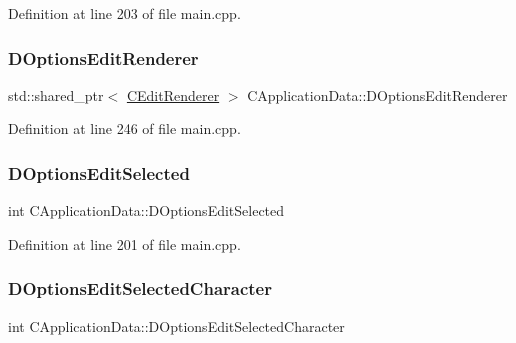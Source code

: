 Definition at line 203 of file main.\+cpp.

\hypertarget{classCApplicationData_ad445b9a4d742414d09196de7cd8a5b26}{}\label{classCApplicationData_ad445b9a4d742414d09196de7cd8a5b26} 
\subsubsection{\texorpdfstring{D\+Options\+Edit\+Renderer}{DOptionsEditRenderer}}
{\footnotesize\ttfamily std\+::shared\+\_\+ptr$<$ \hyperlink{classCEditRenderer}{C\+Edit\+Renderer} $>$ C\+Application\+Data\+::\+D\+Options\+Edit\+Renderer\hspace{0.3cm}{\ttfamily [protected]}}



Definition at line 246 of file main.\+cpp.

\hypertarget{classCApplicationData_aee4aa5eb5b89b86eb2648d0f9c7358f9}{}\label{classCApplicationData_aee4aa5eb5b89b86eb2648d0f9c7358f9} 
\subsubsection{\texorpdfstring{D\+Options\+Edit\+Selected}{DOptionsEditSelected}}
{\footnotesize\ttfamily int C\+Application\+Data\+::\+D\+Options\+Edit\+Selected\hspace{0.3cm}{\ttfamily [protected]}}



Definition at line 201 of file main.\+cpp.

\hypertarget{classCApplicationData_a921d69021fc61e51d12d8a26a5ac1a89}{}\label{classCApplicationData_a921d69021fc61e51d12d8a26a5ac1a89} 
\subsubsection{\texorpdfstring{D\+Options\+Edit\+Selected\+Character}{DOptionsEditSelectedCharacter}}
{\footnotesize\ttfamily int C\+Application\+Data\+::\+D\+Options\+Edit\+Selected\+Character\hspace{0.3cm}{\ttfamily [protected]}}



